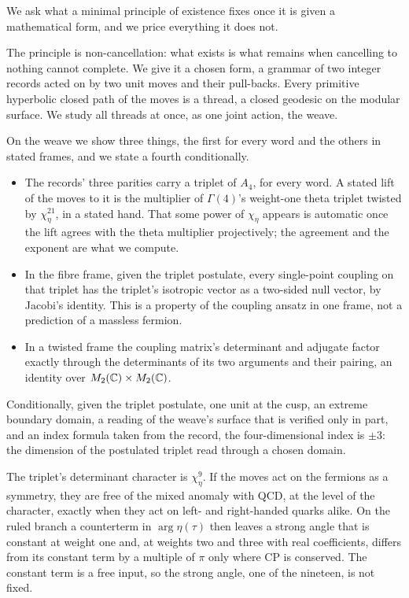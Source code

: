 We ask what a minimal principle of existence fixes once it is given a mathematical form, and we price everything it
does not.

The principle is non-cancellation: what exists is what remains when cancelling to nothing cannot complete. We give it a
chosen form, a grammar of two integer records acted on by two unit moves and their pull-backs. Every primitive hyperbolic closed path of the
moves is a thread, a closed geodesic on the modular surface. We study all threads at once, as one joint action, the
weave.

On the weave we show three things, the first for every word and the others in stated frames, and we state a fourth
conditionally.
\begin{itemize}
\item The records' three parities carry a triplet of $A_4$, for every word. A stated lift of the moves to it is the
  multiplier of $\Gamma(4)$'s weight-one theta triplet twisted by $\chi_\eta^{21}$, in a stated hand. That some power of
  $\chi_\eta$ appears is automatic once the lift agrees with the theta multiplier projectively; the agreement and the
  exponent are what we compute.
\item In the fibre frame, given the triplet postulate, every single-point coupling on that triplet has the triplet's
  isotropic vector as a two-sided null vector, by Jacobi's identity. This is a property of the coupling ansatz in one
  frame, not a prediction of a massless fermion.
\item In a twisted frame the coupling matrix's determinant and adjugate factor exactly through the determinants of
  its two arguments and their pairing, an identity over $M_2(\mathbb{C})\times M_2(\mathbb{C})$.
\end{itemize}
Conditionally, given the triplet postulate, one unit at the cusp, an extreme boundary domain, a reading of the weave's
surface that is verified only in part, and an index formula taken from the record, the four-dimensional index is
$\pm3$: the dimension of the postulated triplet read through a chosen domain.

The triplet's determinant character is $\chi_\eta^9$. If the moves act on the fermions as a symmetry, they are free of
the mixed anomaly with QCD, at the level of the character, exactly when they act on left- and right-handed quarks
alike. On the ruled branch a counterterm in $\arg\eta(\tau)$ then leaves a strong angle that is constant at weight one
and, at weights two and three with real coefficients, differs from its constant term by a multiple of $\pi$ only where
CP is conserved. The constant term is a free input, so the strong angle, one of the nineteen, is not fixed.

